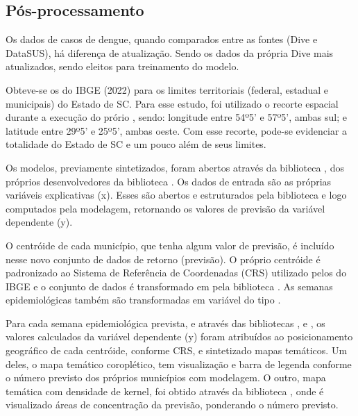 \documentclass[
	12pt,				%
	openright,			%
	oneside,			%
	a4paper,			%
	english,			%
	french,				%
	spanish,			%
	brazil				%
	dvipsnames, table]{abntex2}
\begin{document}
\subsection{Pós-processamento}

\indent Os dados de casos de dengue, quando comparados entre as fontes (\acrshort{Dive} e \acrshort{DataSUS}), há diferença de atualização. Sendo os dados da própria \acrshort{Dive} mais atualizados, sendo eleitos para treinamento do modelo.

\indent Obteve-se os  do \acrshort{IBGE} (2022) para os limites territoriais (federal, estadual e municipais) do Estado de \acrlong{SC}. Para esse estudo, foi utilizado o recorte espacial durante a execução do prório , sendo: longitude entre 54º5' e 57º5', ambas sul; e latitude entre 29º5' e 25º5', ambas oeste. Com esse recorte, pode-se evidenciar a totalidade do Estado de \acrlong{SC} e um pouco além de seus limites.

\indent Os modelos, previamente sintetizados, foram abertos através da biblioteca , dos próprios desenvolvedores da biblioteca . Os dados de entrada são as próprias variáveis explicativas (x). Esses são abertos e estruturados pela biblioteca  e logo computados pela modelagem, retornando os valores de previsão da variável dependente (y).

\indent O centróide de cada município, que tenha algum valor de previsão, é incluído nesse novo conjunto de dados de retorno (previsão). O próprio centróide é padronizado ao Sistema de Referência de Coordenadas (\acrfull{CRS}) utilizado pelos  do \acrshort{IBGE} e o conjunto  de dados é transformado em  pela biblioteca . As semanas epidemiológicas também são transformadas em variável do tipo .

\indent Para cada semana epidemiológica prevista, e através das bibliotecas ,  e , os valores calculados da variável dependente (y) foram atribuídos ao posicionamento geográfico de cada centróide, conforme \acrshort{CRS}, e sintetizado mapas temáticos. Um deles, o mapa temático coroplético, tem visualização e barra de legenda conforme o número previsto dos próprios municípios com modelagem. O outro, mapa temática com densidade de kernel, foi obtido através da biblioteca , onde é visualizado áreas de concentração da previsão, ponderando o número previsto.
\end{document}
